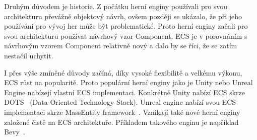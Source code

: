 Druhým důvodem je historie. Z počátku herní enginy používali pro svou architekturu převážně objektový návrh, ovšem později se ukázalo, že při jeho používání pro vývoj her může být problematické. Proto herní enginy začali pro svou architekturu používat návrhový vzor Component. ECS je v porovnáním s návrhovým vzorem Component relativně nový a dalo by se říci, že se zatím nestačil uchytit.

I přes výše zmíněné důvody začíná, díky vysoké flexibilitě a velkému výkonu, ECS růst na popularitě. Proto populární herní enginy jako je Unity nebo Unreal Engine nabízejí vlastní ECS implementaci. Konkrétně Unity nabízí ECS skrze DOTS~\cite{UnityDOTS} (Data-Oriented Technology Stack). Unreal engine nabízí svou ECS implementaci skrze MassEntity framework~\cite{UnrealMass}. Vznikají také nové herní enginy založené čistě na ECS architektuře. Příkladem takového enginu je například Bevy~\cite{Bevy}.

